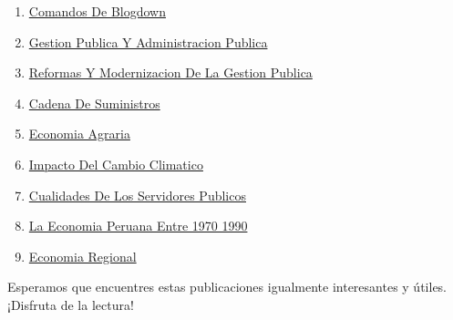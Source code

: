 \documentclass[
  jou,
  floatsintext,
  longtable,
  a4paper,
  nolmodern,
  notxfonts,
  notimes,
  colorlinks=true,linkcolor=blue,citecolor=blue,urlcolor=blue]{apa7}
\begin{document}
\begin{enumerate}
{  De Negocio Exportacion De Tuna}
\item
  \href{https://achalmaedison.netlify.app/blog/posts/2021-07-14-comandos-de-blogdown/index.pdf}{}
  \href{https://achalmaedison.netlify.app/blog/posts/2021-07-14-comandos-de-blogdown}{Comandos
  De Blogdown}
\item
  \href{https://achalmaedison.netlify.app/blog/posts/2021-10-01-gestion-publica-y-administracion-publica/index.pdf}{}
  \href{https://achalmaedison.netlify.app/blog/posts/2021-10-01-gestion-publica-y-administracion-publica}{Gestion
  Publica Y Administracion Publica}
\item
  \href{https://achalmaedison.netlify.app/blog/posts/2021-10-01-reformas-y-modernizacion-de-la-gestion-publica/index.pdf}{}
  \href{https://achalmaedison.netlify.app/blog/posts/2021-10-01-reformas-y-modernizacion-de-la-gestion-publica}{Reformas
  Y Modernizacion De La Gestion Publica}
\item
  \href{https://achalmaedison.netlify.app/blog/posts/2022-01-23-cadena\%20de\%20suministros/index.pdf}{}
  \href{https://achalmaedison.netlify.app/blog/posts/2022-01-23-cadena\%20de\%20suministros}{Cadena
  De Suministros}
\item
  \href{https://achalmaedison.netlify.app/blog/posts/2022-04-22-economia-agraria/index.pdf}{}
  \href{https://achalmaedison.netlify.app/blog/posts/2022-04-22-economia-agraria}{Economia
  Agraria}
\item
  \href{https://achalmaedison.netlify.app/blog/posts/2022-06-02-impacto-del-cambio-climatico/index.pdf}{}
  \href{https://achalmaedison.netlify.app/blog/posts/2022-06-02-impacto-del-cambio-climatico}{Impacto
  Del Cambio Climatico}
\item
  \href{https://achalmaedison.netlify.app/blog/posts/2023-05-11-cualidades-de-los-servidores-publicos/index.pdf}{}
  \href{https://achalmaedison.netlify.app/blog/posts/2023-05-11-cualidades-de-los-servidores-publicos}{Cualidades
  De Los Servidores Publicos}
\item
  \href{https://achalmaedison.netlify.app/blog/posts/2023-05-12-la-economia-peruana-entre-1970-1990/index.pdf}{}
  \href{https://achalmaedison.netlify.app/blog/posts/2023-05-12-la-economia-peruana-entre-1970-1990}{La
  Economia Peruana Entre 1970 1990}
\item
  \href{https://achalmaedison.netlify.app/blog/posts/2023-05-16-economia-regional/index.pdf}{}
  \href{https://achalmaedison.netlify.app/blog/posts/2023-05-16-economia-regional}{Economia
  Regional}
\end{enumerate}

Esperamos que encuentres estas publicaciones igualmente interesantes y
útiles. ¡Disfruta de la lectura!
\end{document}
